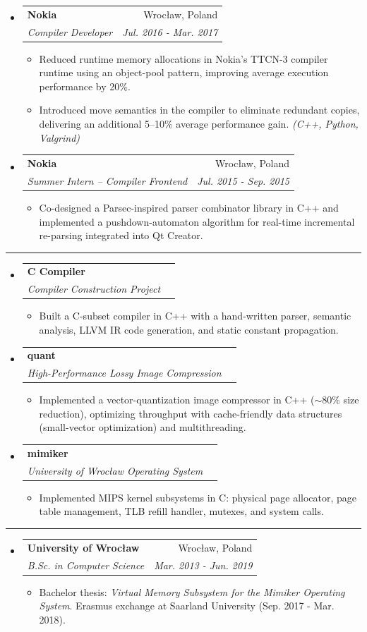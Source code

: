 \documentclass[letterpaper,11pt]{article}
\makeatletter
\newcommand{\resitem}[1]{\item #1 \vspace{-2pt}}
\newcommand{\resheading}[1]{\vspace{6pt}\noindent{\large\textbf{#1}}\vspace{2pt}\hrule\vspace{4pt}}
\newcommand{\ressubheading}[4]{
\begin{tabular*}{6.5in}{l@{\extracolsep{\fill}}r}
		\textbf{#1} & #2 \\
		\textit{#3} & \textit{#4} \\
\end{tabular*}\vspace{-6pt}}
\makeatother
\begin{document}
\begin{itemize}
\item
	\ressubheading{Nokia}{Wroc\l{}aw, Poland}{Compiler Developer}{Jul. 2016 - Mar. 2017}
	\begin{itemize}
		\resitem{Reduced runtime memory allocations in Nokia's TTCN-3 compiler runtime using an object-pool pattern, improving average execution performance by 20\%.}
		\resitem{Introduced move semantics in the compiler to eliminate redundant copies, delivering an additional 5--10\% average performance gain. \textit{(C++, Python, Valgrind)}}
	\end{itemize}

\item
	\ressubheading{Nokia}{Wroc\l{}aw, Poland}{Summer Intern -- Compiler Frontend}{Jul. 2015 - Sep. 2015}
	\begin{itemize}
		\resitem{Co-designed a Parsec-inspired parser combinator library in C++ and implemented a pushdown-automaton algorithm for real-time incremental re-parsing integrated into Qt Creator.}
	\end{itemize}
\end{itemize}

\resheading{Selected Projects}
\begin{itemize}
\item
	\ressubheading{C Compiler}{}{Compiler Construction Project}{}
	\begin{itemize}
		\resitem{Built a C-subset compiler in C++ with a hand-written parser, semantic analysis, LLVM IR code generation, and static constant propagation.}
	\end{itemize}
\item
	\ressubheading{quant}{}{High-Performance Lossy Image Compression}{}
	\begin{itemize}
		\resitem{Implemented a vector-quantization image compressor in C++ ($\sim$80\% size reduction), optimizing throughput with cache-friendly data structures (small-vector optimization) and multithreading.}
	\end{itemize}
\item
	\ressubheading{mimiker}{}{University of Wroc\l{}aw Operating System}{}
	\begin{itemize}
		\resitem{Implemented MIPS kernel subsystems in C: physical page allocator, page table management, TLB refill handler, mutexes, and system calls.}
	\end{itemize}
\end{itemize}

\resheading{Education}
\begin{itemize}
\item
	\ressubheading{University of Wroc\l{}aw}{Wroc\l{}aw, Poland}{B.Sc. in Computer Science}{Mar. 2013 - Jun. 2019}
	\begin{itemize}
		\resitem{Bachelor thesis: \textit{Virtual Memory Subsystem for the Mimiker Operating System}. Erasmus exchange at Saarland University (Sep. 2017 - Mar. 2018).}
	\end{itemize}
\end{itemize}
\end{document}
